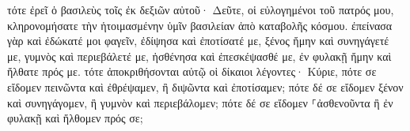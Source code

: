 \documentclass{openreader}
\begin{document}
τότε ἐρεῖ ὁ βασιλεὺς τοῖς ἐκ δεξιῶν αὐτοῦ· Δεῦτε, οἱ εὐλογημένοι τοῦ πατρός μου, κληρονομήσατε τὴν ἡτοιμασμένην ὑμῖν βασιλείαν ἀπὸ καταβολῆς κόσμου. 
ἐπείνασα γὰρ καὶ ἐδώκατέ μοι φαγεῖν, ἐδίψησα καὶ ἐποτίσατέ με, ξένος ἤμην καὶ συνηγάγετέ με, 
γυμνὸς καὶ περιεβάλετέ με, ἠσθένησα καὶ ἐπεσκέψασθέ με, ἐν φυλακῇ ἤμην καὶ ἤλθατε πρός με. 
τότε ἀποκριθήσονται αὐτῷ οἱ δίκαιοι λέγοντες· Κύριε, πότε σε εἴδομεν πεινῶντα καὶ ἐθρέψαμεν, ἢ διψῶντα καὶ ἐποτίσαμεν; 
πότε δέ σε εἴδομεν ξένον καὶ συνηγάγομεν, ἢ γυμνὸν καὶ περιεβάλομεν; 
πότε δέ σε εἴδομεν ⸀ἀσθενοῦντα ἢ ἐν φυλακῇ καὶ ἤλθομεν πρός σε; 
\end{document}
